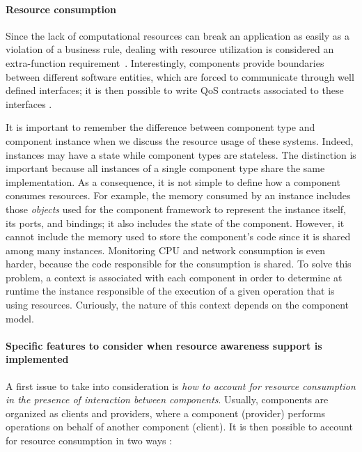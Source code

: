 \paragraph{Resource consumption}

Since the lack of computational resources can break an application as easily as a violation of a business rule, dealing with resource utilization is considered an extra-function requirement~\cite{}.
Interestingly, components provide boundaries between different software entities, which are forced to communicate through well defined interfaces; it is then possible to write QoS contracts associated to these interfaces \cite{Beugnard774917}.

It is important to remember the difference between component type and component instance when we discuss the resource usage of these systems.
Indeed, instances may have a state while component types are stateless.
The distinction is important because all instances of a single component type share the same implementation.
As a consequence, it is not simple to define how a component consumes resources.
For example, the memory consumed by an instance includes those \textit{objects} used for the component framework to represent the instance itself, its ports, and bindings; it also includes the state of the component. 
However, it cannot include the memory used to store the component's code since it is shared among many instances.
Monitoring CPU and network consumption is even harder, because the code responsible for the consumption is shared.
To solve this problem, a context is associated with each component in order to determine at runtime the instance responsible of the execution of a given operation that is using resources.
Curiously, the nature of this context depends on the component model.     

\paragraph{Specific features to consider when resource awareness support is implemented}

A first issue to take into consideration is \textit{how to account for resource consumption in the presence of interaction between components}.
Usually, components are organized as clients and providers, where a component (provider) performs operations on behalf of another component (client).
It is then possible to account for resource consumption in two ways \cite{Miettinen2008,Maurel:2012:AME:2304736.2304763}:

